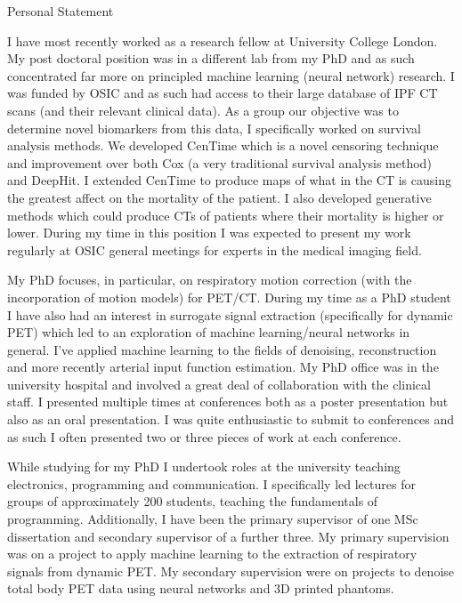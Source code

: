 \documentclass{cv}
\begin{document}
    \begin{rSection}{Personal Statement}
        \item I have most recently worked as a research fellow at University College London. My post doctoral position was in a different lab from my PhD and as such concentrated far more on principled machine learning (neural network) research. I was funded by OSIC and as such had access to their large database of IPF CT scans (and their relevant clinical data). As a group our objective was to determine novel biomarkers from this data, I specifically worked on survival analysis methods. We developed CenTime which is a novel censoring technique and improvement over both Cox (a very traditional survival analysis method) and DeepHit. I extended CenTime to produce maps of what in the CT is causing the greatest affect on the mortality of the patient. I also developed generative methods which could produce CTs of patients where their mortality is higher or lower. During my time in this position I was expected to present my work regularly at OSIC general meetings for experts in the medical imaging field.
        
        \item My PhD focuses, in particular, on respiratory motion correction (with the incorporation of motion models) for PET/CT. During my time as a PhD student I have also had an interest in surrogate signal extraction (specifically for dynamic PET) which led to an exploration of machine learning/neural networks in general. I've applied machine learning to the fields of denoising, reconstruction and more recently arterial input function estimation. My PhD office was in the university hospital and involved a great deal of collaboration with the clinical staff. I presented multiple times at conferences both as a poster presentation but also as an oral presentation. I was quite enthusiastic to submit to conferences and as such I often presented two or three pieces of work at each conference.
        
        \item While studying for my PhD I undertook roles at the university teaching electronics, programming and communication. I specifically led lectures for groups of approximately 200 students, teaching the fundamentals of programming. Additionally, I have been the primary supervisor of one MSc dissertation and secondary supervisor of a further three. My primary supervision was on a project to apply machine learning to the extraction of respiratory signals from dynamic PET. My secondary supervision were on projects to denoise total body PET data using neural networks and 3D printed phantoms.
        

\end{rSection}
\end{document}
